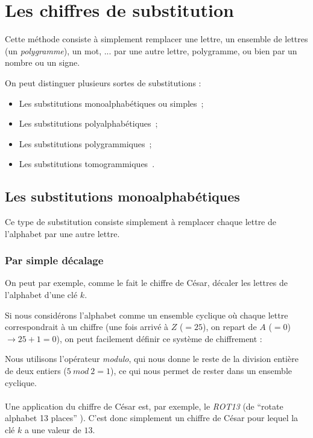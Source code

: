 \chapter{Les chiffres de substitution}
Cette méthode consiste à simplement remplacer une lettre, un ensemble
de lettres (un \emph{polygramme}), un mot, ...  par une autre lettre,
polygramme, ou bien par un nombre ou un signe.

On peut distinguer plusieurs sortes de substitutions : 
\begin{itemize}
  \item Les substitutions monoalphabétiques ou simples~; 
  \item Les substitutions polyalphabétiques~; 
  \item Les substitutions polygrammiques~;
  \item Les substitutions tomogrammiques~.
\end{itemize}

\section{Les substitutions monoalphabétiques}
Ce type de substitution consiste simplement à remplacer chaque lettre
de l'alphabet par une autre lettre.

\subsection{Par simple décalage}
On peut par exemple, comme le fait le chiffre de
César, décaler les lettres de l'alphabet d'une
clé $k$.

 Si nous considérons l'alphabet comme un ensemble cyclique où 
chaque lettre correspondrait à un chiffre (une fois arrivé à $Z$ ($= 25$), on 
repart de $A$ ($= 0$) $\rightarrow 25 + 1 = 0$), on peut facilement définir 
ce système de chiffrement : 
\\

Nous utilisons l'opérateur \emph{modulo}, qui nous donne le reste de
la division entière de deux entiers ($5~ mod~ 2 = 1$), ce qui nous
permet de rester dans un ensemble cyclique. \\
\\

Une application du chiffre de César est, par exemple, le \emph{ROT13}
(de ``rotate alphabet 13 places'' \cite{ROT13HomePage}).
C'est donc simplement un chiffre de César pour lequel la clé $k$ a une
valeur de $13$.


